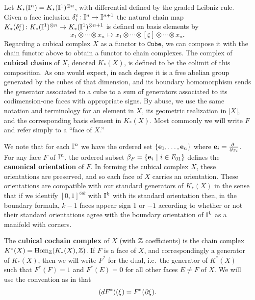 Let $K_*(\mathbb{I}^n) = K_*(\mathbb{I}^1)^{\otimes n}$, with differential defined by the graded Leibniz rule.
Given a face inclusion $\delta_i^{\varepsilon} \colon \mathbb{I}^n \to \mathbb{I}^{n+1}$ the natural chain map $K_*(\delta_i^{\varepsilon}) \colon K_*(\mathbb{I}^1)^{\otimes n} \to K_*(\mathbb{I}^1)^{\otimes n+1}$ is defined on basis elements by
\begin{equation*}
x_1 \otimes \cdots \otimes x_n \mapsto
x_1 \otimes \cdots \otimes [\underline{\varepsilon}] \otimes \cdots \otimes x_n.
\end{equation*}
Regarding a cubical complex $X$ as a functor to $\mathtt{Cube}$, we can compose it with the chain functor above to obtain a functor to chain complexes. 
The complex of \textbf{cubical chains} of $X$, denoted $K_*(X)$, is defined to be the colimit of this composition.
As one would expect, in each degree it is a free abelian group generated by the cubes of that dimension, and its boundary homomorphism sends the
generator associated to a cube to a sum of generators associated to its codimension-one faces with appropriate signs. By abuse, we use the same notation and terminology for an element in $X$, its geometric realization in $|X|$, 
and the corresponding basis element in $K_*(X)$. Most commonly we will write $F$ and refer simply to a ``face of $X$.''

We note that for each $\mathbb{I}^n$ we have the ordered set $\{\mathbf{e}_1, \dots, \mathbf{e}_n\}$ where $\e_i = \frac{\partial\ }{\partial x_i}$.
For any face $F$ of $\mathbb{I}^n$, the ordered subset $\beta_F = \{\mathbf{e}_i\ |\ i \in F_{01}\}$ defines the \textbf{canonical orientation} of $F$. In forming the cubical complex $X$, these orientations are preserved, and so each face of $X$ carries an orientation. These orientations are compatible with our standard generators of $K_*(X)$ in the sense that if we identify $[0,1]^{\otimes k}$ with $\mathbb{I}^k$ with its standard orientation then, in the boundary formula, $k-1$ faces appear sign $1$ or $-1$ according to whether or not their standard orientations agree with the boundary orientation of $\mathbb{I}^k$ as a manifold with corners. 




The \textbf{cubical cochain complex} of $X$ (with $\mathbb{Z}$ coefficients) is the chain complex $K^*(X) = \textup{Hom}_{\mathbb{Z}}(K_*(X), \mathbb{Z})$. If $F$ is a face of $X$, and correspondingly a generator of $K_*(X)$, then we will write $F^*$ for the dual, i.e.\ the generator of $K^*(X)$ such that $F^*(F)=1$ and $F^*(E)=0$ for all other faces $E\neq F$ of $X$. We will use the convention as in \cite{Mun84} that 
$$(dF^*)(\xi)=F^*(\partial \xi).$$





